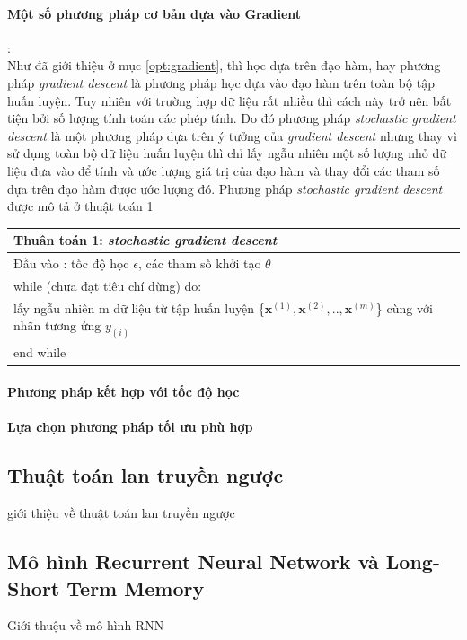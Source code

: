 \documentclass[fontsize=12pt]{scrartcl}
\begin{document}
\paragraph*{Một số phương pháp cơ bản dựa vào Gradient}:\\
Như đã giới thiệu ở mục \ref{opt:gradient}, thì học dựa trên đạo hàm, hay phương pháp \textit{gradient descent} là phương pháp học dựa vào đạo hàm trên toàn bộ tập huấn luyện. Tuy nhiên với trường hợp dữ liệu rất nhiều thì cách này trở nên bất tiện bởi số lượng tính toán các phép tính. Do đó phương pháp \textit{stochastic gradient descent} là một phương pháp dựa trên ý tưởng của \textit{gradient descent} nhưng thay vì sử dụng toàn bộ dữ liệu huấn luyện thì chỉ lấy ngẫu nhiên một số lượng nhỏ dữ liệu đưa vào để tính và ước lượng giá trị của đạo hàm và thay đổi các tham số dựa trên đạo hàm được ước lượng đó. Phương pháp \textit{stochastic gradient descent} được mô tả ở thuật toán 1
\begin{table}[ht]
\begin{center}
  \begin{tabular}{l}
\hline
Thuân toán 1: \textit{stochastic  gradient descent}\\
\hline
Đầu vào : tốc độ học $\epsilon$, các tham số khởi tạo $\theta$\\
while (chưa đạt tiêu chí dừng) do:\\
\hspace{1em} lấy ngẫu nhiên m dữ liệu từ tập huấn luyện \{$\boldsymbol{x}^{(1)}, \boldsymbol{x}^{(2)}, . . , \boldsymbol{x}^{(m)}$\} cùng với nhãn tương ứng $y_{(i)}$\\
end while\\
  \end{tabular}
  \end{center}
\end{table}%
\paragraph*{Phương pháp kết hợp với tốc độ học}
\paragraph*{Lựa chọn phương pháp tối ưu phù hợp}
\subsection{Thuật toán lan truyền ngược}
giới thiệu về thuật toán lan truyền ngược
\subsection{Mô hình Recurrent Neural Network và Long-Short Term Memory}
\par
Giới thuệu về mô hình RNN
\end{document}
